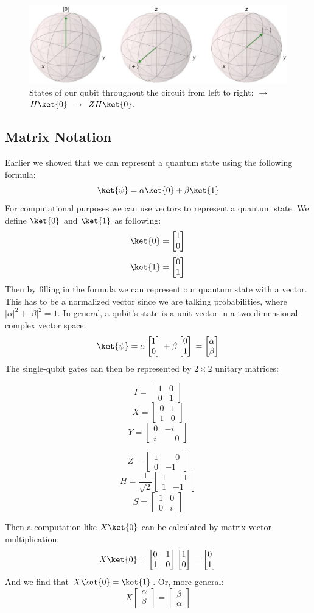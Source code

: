 \documentclass[11pt]{article}
\newcommand{\igate}{
  \begin{bmatrix}
  1 & 0 \\
  0 & 1 
  \end{bmatrix}
}
\newcommand{\xgate}{
  \begin{bmatrix}
  0 & 1 \\
  1 & 0 
  \end{bmatrix}
}
\newcommand{\ygate}{
  \begin{bmatrix}
  0 & -i \\
  i & \phantom{-}0
  \end{bmatrix}
}
\newcommand{\zgate}{
  \begin{bmatrix}
  1 & \phantom{-}0 \\
  0 & -1
  \end{bmatrix}
}
\newcommand{\hgate}{
  \dfrac{1}{\sqrt2}
  \begin{bmatrix}
  1 & \phantom{-}1 \\
  1 & -1
  \end{bmatrix}
}
\newcommand{\sgate}{
  \begin{bmatrix}
  1 & 0 \\
  0 & i
  \end{bmatrix}
}
\newcommand{\qstatezero}{
  \begin{bmatrix}1 \\ 0\end{bmatrix}
}
\newcommand{\qstateone}{
  \begin{bmatrix}0 \\ 1\end{bmatrix}
}
\begin{document}
\begin{figure}[ht]
  \centering
  \includegraphics[scale=0.37]{images/simple_circuit.eps}
  \caption{States of our qubit throughout the circuit from left to right:  $\rightarrow$ $H\ket{0}$ $\rightarrow$ $ZH\ket{0}.$}
  \label{fig:gate_rotations}
\end{figure}

\subsection{Matrix Notation} \label{sec:matrix_notation}
Earlier we showed that we can represent a quantum state using the following formula:
\[\ket{\psi} = \alpha\ket{0} + \beta\ket{1}\]
For computational purposes we can use vectors to represent a quantum state. We define $\ket{0}$ and $\ket{1}$ as following:
\[\ket{0} = \qstatezero{}\]
\[\ket{1} = \qstateone{}\]
Then by filling in the formula we can represent our quantum state with a vector. This has to be a normalized vector since we are talking probabilities, where $|\alpha|^2+|\beta|^2 = 1$. In general, a qubit's state is a unit vector in a two-dimensional complex vector space.
\[
  \ket{\psi} = \alpha\qstatezero{} + \beta\qstateone{} =
\begin{bmatrix}\alpha \\ \beta\end{bmatrix}
\]
The single-qubit gates can then be represented by $2 \times 2$ unitary matrices:
\setlength\multicolsep{0pt}
\begin{multicols}{3}
  \[
    I = \igate{}
  \]
  \vfill
  \[
    X = \xgate{}
  \]
  \vfill
  \[
    Y = \ygate{}
  \]
\end{multicols}

\begin{multicols}{3}
  \[
    Z = \zgate{}
  \]
  \vfill
  \[
    H = \hgate{}
  \]
  \vfill
  \[
    S = \sgate{}
  \]
\end{multicols}
\bigskip
\noindent
Then a computation like $X\ket{0}$ can be calculated by matrix vector multiplication:
\[
X\ket{0} = \xgate{} \qstatezero{} = \qstateone{}
\]
And we find that $X\ket{0} = \ket{1}$. Or, more general:
\[
  X\begin{bmatrix}\alpha \\ \beta\end{bmatrix} = \begin{bmatrix}\beta \\ \alpha\end{bmatrix}
\]
\end{document}
